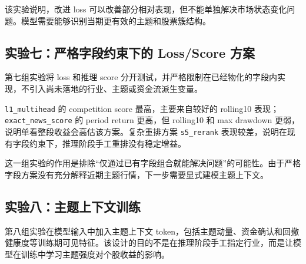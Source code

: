 \documentclass[UTF8,a4paper,12pt,fontset=none]{ctexart}
\begin{document}
该实验说明，改进 loss 可以改善部分相对表现，但不能单独解决市场状态变化问题。模型需要能够识别当期更有效的主题和股票簇结构。

\subsection{实验七：严格字段约束下的 Loss/Score 方案}

第七组实验将 loss 和推理 score 分开测试，并严格限制在已经物化的字段内实现，不引入尚未落地的行业、主题或资金流派生变量。

\begin{table}[H]
  \centering
  \caption{严格字段约束下的 loss/score 方案}
\end{table}

\texttt{l1\_multihead} 的 competition score 最高，主要来自较好的 rolling10 表现；\texttt{exact\_news\_score} 的 period return 更高，但 rolling10 和 max drawdown 更弱，说明单看整段收益会高估该方案。复杂重排方案 \texttt{s5\_rerank} 表现较差，说明在现有字段约束下，推理阶段手工重排没有稳定增益。

这一组实验的作用是排除“仅通过已有字段组合就能解决问题”的可能性。由于严格字段方案没有充分解释近期主题行情，下一步需要显式建模主题上下文。

\subsection{实验八：主题上下文训练}

第八组实验在模型输入中加入主题上下文 token，包括主题动量、资金确认和回撤健康度等训练期可见特征。该设计的目的不是在推理阶段手工指定行业，而是让模型在训练中学习主题强度对个股收益的影响。
\end{document}

